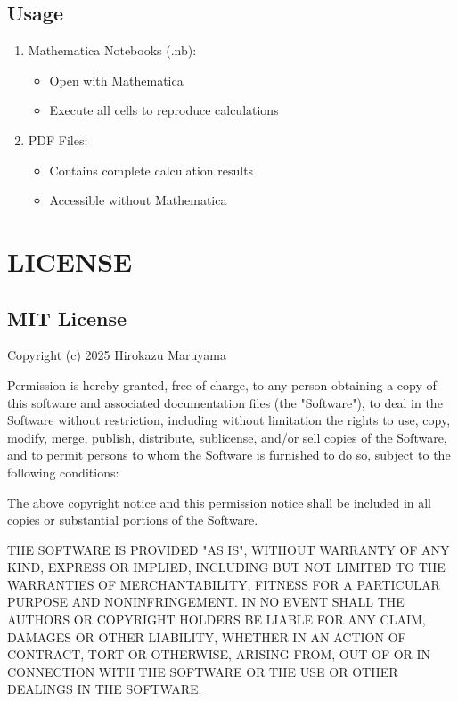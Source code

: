 \documentclass[12pt]{article}
\begin{document}
\subsection*{Usage}
\begin{enumerate}
\item Mathematica Notebooks (.nb):
   \begin{itemize}
   \item Open with Mathematica
   \item Execute all cells to reproduce calculations
   \end{itemize}

\item PDF Files:
   \begin{itemize}
   \item Contains complete calculation results
   \item Accessible without Mathematica
   \end{itemize}
\end{enumerate}

\section*{LICENSE}
\subsection*{MIT License}

Copyright (c) 2025 Hirokazu Maruyama

Permission is hereby granted, free of charge, to any person obtaining a copy
of this software and associated documentation files (the "Software"), to deal
in the Software without restriction, including without limitation the rights
to use, copy, modify, merge, publish, distribute, sublicense, and/or sell
copies of the Software, and to permit persons to whom the Software is
furnished to do so, subject to the following conditions:

The above copyright notice and this permission notice shall be included in all
copies or substantial portions of the Software.

THE SOFTWARE IS PROVIDED "AS IS", WITHOUT WARRANTY OF ANY KIND, EXPRESS OR
IMPLIED, INCLUDING BUT NOT LIMITED TO THE WARRANTIES OF MERCHANTABILITY,
FITNESS FOR A PARTICULAR PURPOSE AND NONINFRINGEMENT. IN NO EVENT SHALL THE
AUTHORS OR COPYRIGHT HOLDERS BE LIABLE FOR ANY CLAIM, DAMAGES OR OTHER
LIABILITY, WHETHER IN AN ACTION OF CONTRACT, TORT OR OTHERWISE, ARISING FROM,
OUT OF OR IN CONNECTION WITH THE SOFTWARE OR THE USE OR OTHER DEALINGS IN THE
SOFTWARE.
\end{document}
